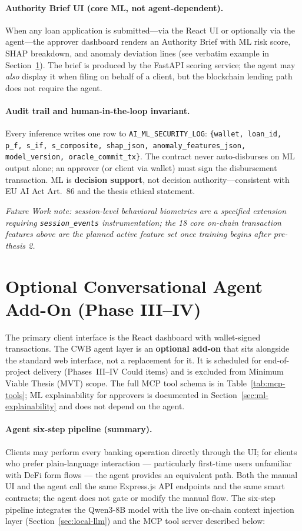 \documentclass[12pt, a4paper]{report}
\begin{document}
\paragraph{Authority Brief UI (core ML, not agent-dependent).}
When any loan application is submitted---via the React UI or optionally via the agent---the approver dashboard renders an Authority Brief with ML risk score, SHAP breakdown, and anomaly deviation lines (see verbatim example in Section~\ref{sec:optional-agent}). The brief is produced by the FastAPI scoring service; the agent may \textit{also} display it when filing on behalf of a client, but the blockchain lending path does not require the agent.

\paragraph{Audit trail and human-in-the-loop invariant.}
Every inference writes one row to \texttt{AI\_ML\_SECURITY\_LOG}: \texttt{\{wallet, loan\_id, p\_f, s\_if, s\_composite, shap\_json, anomaly\_features\_json, model\_version, oracle\_commit\_tx\}}. The contract never auto-disburses on ML output alone; an approver (or client via wallet) must sign the disbursement transaction. ML is \textbf{decision support}, not decision authority---consistent with EU AI Act Art.~86 and the thesis ethical statement.

\noindent\textit{Future Work note: session-level behavioral biometrics are a specified extension requiring \texttt{session\_events} instrumentation; the 18 core on-chain transaction features above are the planned active feature set once training begins after pre-thesis 2.}

\section{Optional Conversational Agent Add-On (Phase III--IV)}
\label{sec:optional-agent}

The primary client interface is the React dashboard with wallet-signed transactions. The CWB agent layer is an \textbf{optional add-on} that sits alongside the standard web interface, not a replacement for it. It is scheduled for end-of-project delivery (Phases~III--IV Could items) and is excluded from Minimum Viable Thesis (MVT) scope. The full MCP tool schema is in Table~\ref{tab:mcp-tools}; ML explainability for approvers is documented in Section~\ref{sec:ml-explainability} and does not depend on the agent.

\paragraph{Agent six-step pipeline (summary).} Clients may perform every banking operation directly through the UI; for clients who prefer plain-language interaction --- particularly first-time users unfamiliar with DeFi form flows --- the agent provides an equivalent path. Both the manual UI and the agent call the same Express.js API endpoints and the same smart contracts; the agent does not gate or modify the manual flow. The six-step pipeline integrates the Qwen3-8B model with the live on-chain context injection layer (Section~\ref{sec:local-llm}) and the MCP tool server described below:
\end{document}
